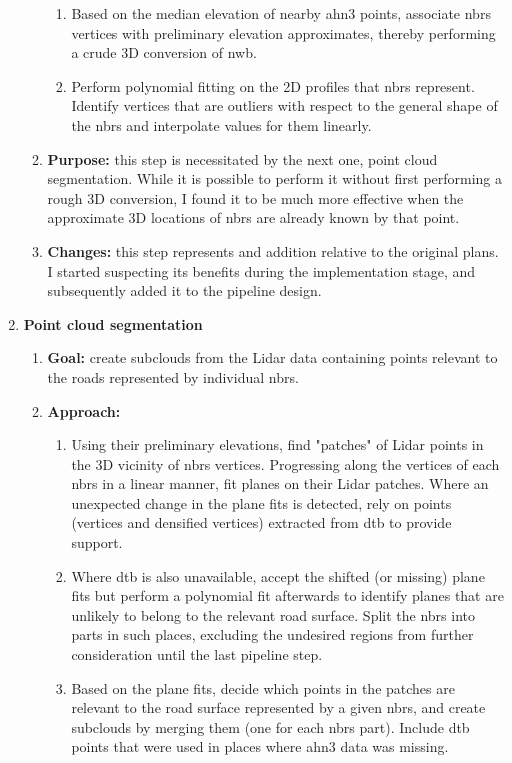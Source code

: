 \begin{enumerate}
\begin{enumerate}
\begin{enumerate}
            \item Based on the median elevation of nearby \ac{ahn3} points, associate \ac{nbrs} vertices with preliminary elevation approximates, thereby performing a crude 3D conversion of \ac{nwb}.
            \item Perform polynomial fitting on the 2D profiles that \ac{nbrs} represent. Identify vertices that are outliers with respect to the general shape of the \ac{nbrs} and interpolate values for them linearly.
        \end{enumerate}
        \item \textbf{Purpose:} this step is necessitated by the next one, point cloud segmentation. While it is possible to perform it without first performing a rough 3D conversion, I found it to be much more effective when the approximate 3D locations of \ac{nbrs} are already known by that point.
        \item \textbf{Changes:} this step represents and addition relative to the original plans. I started suspecting its benefits during the implementation stage, and subsequently added it to the pipeline design.
    \end{enumerate}
    \item \textbf{Point cloud segmentation}
    \begin{enumerate}
        \item \textbf{Goal:} create subclouds from the Lidar data containing points relevant to the roads represented by individual \ac{nbrs}.
        \item \textbf{Approach:}
        \begin{enumerate}
            \item Using their preliminary elevations, find "patches" of Lidar points in the 3D vicinity of \ac{nbrs} vertices. Progressing along the vertices of each \ac{nbrs} in a linear manner, fit planes on their Lidar patches. Where an unexpected change in the plane fits is detected, rely on points (vertices and densified vertices) extracted from \ac{dtb} to provide support.
            \item Where \ac{dtb} is also unavailable, accept the shifted (or missing) plane fits but perform a polynomial fit afterwards to identify planes that are unlikely to belong to the relevant road surface. Split the \ac{nbrs} into parts in such places, excluding the undesired regions from further consideration until the last pipeline step. 
            \item Based on the plane fits, decide which points in the patches are relevant to the road surface represented by a given \ac{nbrs}, and create subclouds by merging them (one for each \ac{nbrs} part). Include \ac{dtb} points that were used in places where \ac{ahn3} data was missing.

\end{enumerate}
\end{enumerate}
\end{enumerate}

